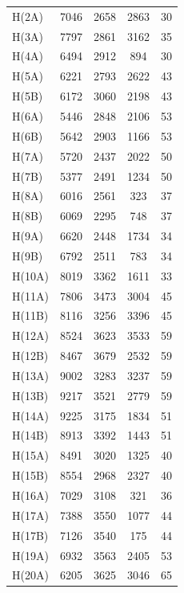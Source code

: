 \begin{center}
\tablelasttail{\bottomrule}
 {\footnotesize \singlespacing
\begin{supertabular}{lcccc}
H(2A)&7046&2658&2863&30\\
H(3A)&7797&2861&3162&35\\
H(4A)&6494&2912&894&30\\
H(5A)&6221&2793&2622&43\\
H(5B)&6172&3060&2198&43\\
H(6A)&5446&2848&2106&53\\
H(6B)&5642&2903&1166&53\\
H(7A)&5720&2437&2022&50\\
H(7B)&5377&2491&1234&50\\
H(8A)&6016&2561&323&37\\
H(8B)&6069&2295&748&37\\
H(9A)&6620&2448&1734&34\\
H(9B)&6792&2511&783&34\\
H(10A)&8019&3362&1611&33\\
H(11A)&7806&3473&3004&45\\
H(11B)&8116&3256&3396&45\\
H(12A)&8524&3623&3533&59\\
H(12B)&8467&3679&2532&59\\
H(13A)&9002&3283&3237&59\\
H(13B)&9217&3521&2779&59\\
H(14A)&9225&3175&1834&51\\
H(14B)&8913&3392&1443&51\\
H(15A)&8491&3020&1325&40\\
H(15B)&8554&2968&2327&40\\
H(16A)&7029&3108&321&36\\
H(17A)&7388&3550&1077&44\\
H(17B)&7126&3540&175&44\\
H(19A)&6932&3563&2405&53\\
H(20A)&6205&3625&3046&65\\

\end{supertabular}}
\end{center}
